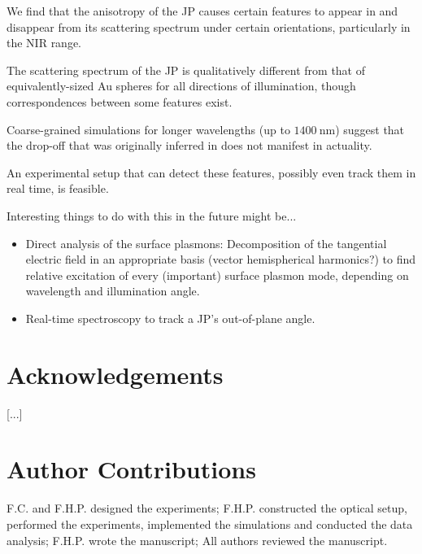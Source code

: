 \documentclass[10pt]{article}
\begin{document}
We find that the anisotropy of the JP causes certain features to appear in and disappear from its scattering spectrum under certain orientations, particularly in the NIR range. 

The scattering spectrum of the JP is qualitatively different from that of equivalently-sized Au spheres for all directions of illumination, though correspondences between some features exist.   

Coarse-grained simulations for longer wavelengths (up to $\SI{1400}{\nano\meter}$) suggest that the drop-off that was originally inferred in \cite*{MA} does not manifest in actuality. 

An experimental setup that can detect these features, possibly even track them in real time, is feasible.

Interesting things to do with this in the future might be...
\begin{itemize}
    \item Direct analysis of the surface plasmons: 
    Decomposition of the tangential electric field in an appropriate basis (vector hemispherical harmonics?) to find relative excitation of every (important) surface plasmon mode, depending on wavelength and illumination angle.
    \item Real-time spectroscopy to track a JP's out-of-plane angle. 
\end{itemize}







\printbibliography

\section*{Acknowledgements}
[...]

\section*{Author Contributions}
F.C. and F.H.P. designed the experiments; 
F.H.P. constructed the optical setup, performed the experiments, implemented the simulations and conducted the data analysis; 
F.H.P. wrote the manuscript; 
All authors reviewed the manuscript.
\end{document}
